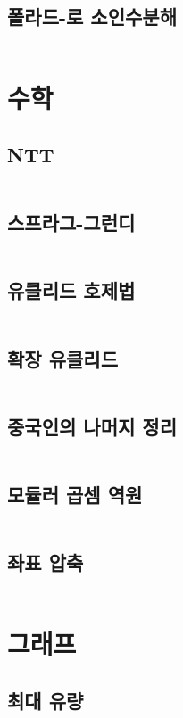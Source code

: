 \documentclass{article}
\begin{document}
\begin{multicols}{2}
\subsection{폴라드-로 소인수분해}
\inputminted[linenos, breaklines]{python}{codes/pollard-rho.py}

\section{수학}
\subsection{NTT}
\inputminted[linenos, breaklines]{python}{codes/ntt.py}
\subsection{스프라그-그런디}
\inputminted[linenos, breaklines]{python}{codes/nim.py}
\subsection{유클리드 호제법}
\inputminted[linenos, breaklines]{cpp}{codes/euclid.cpp}
\subsection{확장 유클리드}
\inputminted[linenos, breaklines]{python}{codes/eea.py}

\subsection{중국인의 나머지 정리}
\inputminted[linenos, breaklines]{cpp}{codes/crt.cpp}
\subsection{모듈러 곱셈 역원}
\inputminted[linenos, breaklines]{python}{codes/modular.py}
\subsection{좌표 압축}
\inputminted[linenos, breaklines]{python}{codes/comp.py}

\section{그래프}
\subsection{최대 유량}
\inputminted[linenos, breaklines]{python}{codes/mf.py}

\end{multicols}
\end{document}
